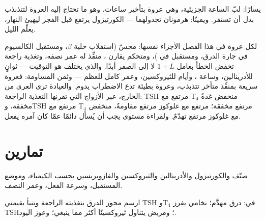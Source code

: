 \begin{omfigure}
{\small يسارًا: لبّ الساعة الجزيئية، وهي عروة  بتأخير ساعات، وهو ما تحتاج إليه العروة لتتذبذب بدل أن
تستقر. ويمينًا: هرمونان تجدولهما --- الكورتيزول يرتفع قبل
الفجر ليهيئ النهار،  يعلّم الليل.}
\end{omfigure}

\begin{remark}\label{rem:b3:endocrinology:control}
لكل عروة في هذا الفصل الأجزاء نفسها: مجسّ (استقلاب خلية
$\beta$، ومستقبل الكالسيوم في جارة الدرق، ومستقبل  في )، ومتحكم يقارن ،  منفِّذ له
عمر نصفه، وتغذية راجعة تخفض الخطأ بعامل $1 + L$ لا إلى الصفر
أبدًا. والذي يختلف هو التوقيت --- ثوانٍ للأدرينالين، وساعة
، وأيام للثيروكسين، وعمر كامل للعظم --- وثمن
المساومة: فعروة سريعة بمنفِّذ متأخر تتذبذب، وعروة بطيئة تدع
الاضطراب يدوم. والعيادة ترى العرى من الخارج، عبر الأزواج
التي تقرنها التغذية الراجعة:  TSH مرتفع مع T$_{4}$ منخفض
غدةٌ مخفقة، وTSH مرتفع مع T$_{4}$ مرتفع  مخفقة؛
 مرتفع مع غلوكوز مرتفع مقاومةٌ،  منخفض مع
غلوكوز مرتفع تهدّمٌ. ولقراءة مستوى  يجب أن يُسأل دائمًا
عمّا كان آمره يفعل.
\end{remark}

\section{تمارين}

\begin{exercise}[$\star$]\label{exo:b3:endocrinology:1}
صنّف  والكورتيزول والأدرينالين والثيروكسين
والفازوبريسين بحسب الكيمياء، وموضع المستقبل، وسرعة الفعل،
وعمر النصف.
\end{exercise}

\begin{exercise}[$\star$]\label{exo:b3:endocrinology:2}
ارسم محور الدرق بتغذيته الراجعة وتنبأ بقيمتي TSH وT$_{4}$ في:
درق مهدَّم؛  نخامي يفرز TSH؛ ومريض يتناول ثيروكسينًا
أكثر مما ينبغي؛ وعوز اليود.
\end{exercise}

